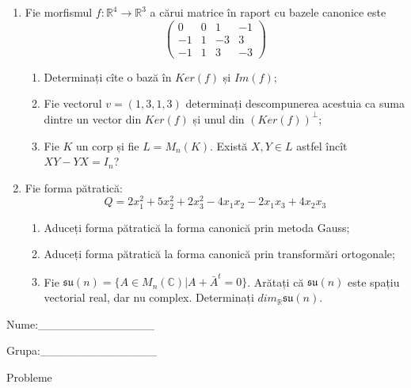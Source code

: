 \documentclass{article}
\begin{document}
\begin{enumerate}
 \item Fie morfismul $f:\mathbb{R}^4 \to \mathbb{R}^3$ a cărui matrice în raport cu bazele canonice este
$$\begin{pmatrix}
0&0&1&-1\\
-1&1&-3&3\\
-1&1&3&-3
\end{pmatrix}$$

\begin{enumerate}
\item Determinați cîte o bază în $Ker(f)$ și $Im(f)$;
\item Fie vectorul $v=(1,3,1,3)$ determinați descompunerea acestuia ca suma dintre un vector din $Ker(f)$ și unul din $(Ker(f))^\perp$;
\item Fie $K$ un corp și fie $L=M_n(K)$. Există $X,Y \in L$ astfel încît $XY-YX=I_n$?  
\end{enumerate}
\item Fie forma pătratică:
$$Q= 2x_1^2+5x_2^2+2x_3^2-4x_1x_2-2x_1x_3+4x_2x_3$$

\begin{enumerate}
\item Aduceți forma pătratică la forma canonică prin metoda Gauss;
\item Aduceți forma pătratică la forma canonică prin transformări ortogonale;
\item Fie $\mathfrak{su}(n)=\{ A \in M_n(\mathbb{C}) | A+\bar{A}^t=0\}$. Arătați că $\mathfrak{su}(n)$ este spațiu vectorial real, dar nu complex.
Determinați $dim_{\mathbb{R}}\mathfrak{su}(n)$.
\end{enumerate}
\end{enumerate}
\newpage
\begin{flushright}
Nume:\_\_\_\_\_\_\_\_\_\_\_\_\_\_
 
 
Grupa:\_\_\_\_\_\_\_\_\_\_\_\_\_\_
\end{flushright}
\begin{center}
\vspace{2cm}
{\Large Probleme}
\vspace{2cm}
\end{center}
\end{document}
